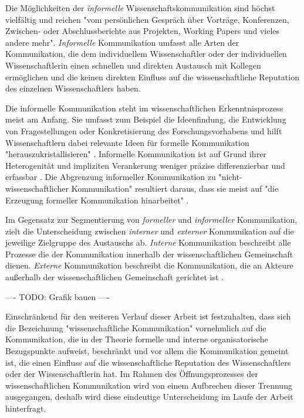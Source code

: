 Die Möglichkeiten der \textit{informelle} Wissenschaftskommunikation sind höchst vielfältig und reichen "vom persönlichen Gespräch über Vorträge, Konferenzen, Zwischen- oder Abschlussberichte aus Projekten, Working Papers und vieles andere mehr"\cite{Hanekop_2014}. \textit{Informelle} Kommunikation umfasst alle Arten der Kommunikation, die dem individuellem Wissenschaftler oder der individuellen Wissenschaftlerin einen schnellen und direkten Austausch mit Kollegen ermöglichen und die keinen direkten Einfluss auf die wissenschaftliche Reputation des einzelnen Wissenschaftlers haben.

Die informelle Kommunikation steht im wissenschaftlichen Erkenntnisprozess meist am Anfang. Sie umfasst zum Beispiel die Ideenfindung, die Entwicklung von Fragestellungen oder Konkretisierung des Forschungsvorhabens und hilft Wissenschaftlern dabei relevante Ideen für formelle Kommunikation "herauszukristallisieren" \cite{Hanekop_2014}. Informelle Kommunikation ist auf Grund ihrer Heterogenität und impliziten Verankerung weniger präzise differenzierbar und erfassbar \cite{kaden_2009_library}. Die Abgrenzung informeller Kommunikation zu "nicht-wissenschaftlicher Kommunikation" resultiert daraus, dass sie meist auf "die Erzeugung formeller Kommunikation hinarbeitet" \cite{kaden_2009_library}.

Im Gegensatz zur Segmentierung von \textit{formeller} und \textit{informeller} Kommunikation, zielt die Unterscheidung zwischen \textit{interner} und \textit{externer} Kommunikation auf die jeweilige Zielgruppe des Austauschs ab. \textit{Interne} Kommunikation beschreibt alle Prozesse die der Kommunikation innerhalb der wissenschaftlichen Gemeinschaft dienen. \textit{Externe} Kommunikation beschreibt die Kommunikation, die an Akteure außerhalb der wissenschaftlichen Gemeinschaft gerichtet ist \cite{Konneker_2013}.

---- TODO: Grafik bauen ----

Einschränkend für den weiteren Verlauf dieser Arbeit ist festzuhalten, dass sich die Bezeichnung "wissenschaftliche Kommunikation" vornehmlich auf die Kommunikation, die in der Theorie formelle und interne organisatorische Bezugspunkte aufweist, beschränkt und vor allem die Kommunikation gemeint ist, die einen Einfluss auf die wissenschaftliche Reputation des Wissenschaftlers oder der Wissenschaftlerin hat. Im Rahmen des Öffnungsprozesses der wissenschaftlichen Kommunikation wird von einem Aufbrechen dieser Trennung ausgegangen, deshalb wird diese eindeutige Unterscheidung im Laufe der Arbeit hinterfragt.

